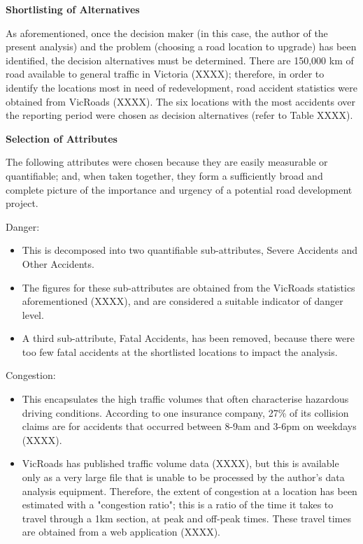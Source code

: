 \documentclass[11pt, a4paper]{article}
\begin{document}
    \textbf{Shortlisting of Alternatives}

    As aforementioned, once the decision maker (in this case, the author of the present analysis) and the problem (choosing a road location to upgrade) has been identified, the decision alternatives must be determined. There are 150,000 km of road available to general traffic in Victoria (XXXX); therefore, in order to identify the locations most in need of redevelopment, road accident statistics were obtained from VicRoads (XXXX). The six locations with the most accidents over the reporting period were chosen as decision alternatives (refer to Table XXXX).

    \textbf{Selection of Attributes}

    The following attributes were chosen because they are easily measurable or quantifiable; and, when taken together, they form a sufficiently broad and complete picture of the importance and urgency of a potential road development project.

    Danger:
    \begin{itemize}
        \item This is decomposed into two quantifiable sub-attributes, Severe Accidents and Other Accidents.
        \item The figures for these sub-attributes are obtained from the VicRoads statistics aforementioned (XXXX), and are considered a suitable indicator of danger level.
        \item A third sub-attribute, Fatal Accidents, has been removed, because there were too few fatal accidents at the shortlisted locations to impact the analysis. 
    \end{itemize}

    Congestion:
    \begin{itemize}
        \item This encapsulates the high traffic volumes that often characterise hazardous driving conditions. According to one insurance company, 27\% of its collision claims are for accidents that occurred between 8-9am and 3-6pm on weekdays (XXXX).
        \item VicRoads has published traffic volume data (XXXX), but this is available only as a very large file that is unable to be processed by the author's data analysis equipment. Therefore, the extent of congestion at a location has been estimated with a "congestion ratio"; this is a ratio of the time it takes to travel through a 1km section, at peak and off-peak times. These travel times are obtained from a web application (XXXX).
    \end{itemize}
\end{document}
